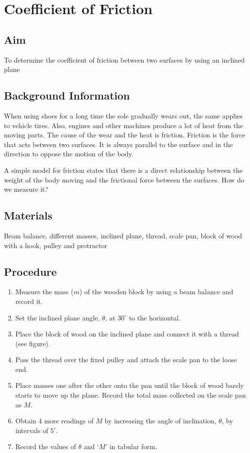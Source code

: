 \chapter{Coefficient of Friction}

\section{Aim}
To determine the coefficient of friction between two surfaces by using an inclined plane

\section{Background Information}
When using shoes for a long time the sole gradually wears out, the same applies to vehicle tires. Also, engines and other machines produce a lot of heat from the moving parts. The cause of the wear and the heat is friction. Friction is the force that acts between two surfaces. It is always parallel to the surface and in the direction to oppose the motion of the body. 

A simple model for friction states that there is a direct relationship between the weight of the body moving and the frictional force between the surfaces. How do we measure it?


\section{Materials}
Beam balance, different masses, inclined plane, thread, scale pan, block of wood with a hook, pulley and protractor

\section{Procedure}
\begin{enumerate}
\item Measure the mass ($m$) of the wooden block by using a beam balance and record it.
\item Set the inclined plane angle, $\theta$, at $30^\circ$ to the horizontal.
\item Place the block of wood on the inclined plane and connect it with a thread (see figure).
\item Pass the thread over the fixed pulley and attach the scale pan to the loose end.
\item Place masses one after the other onto the pan until the block of wood barely starts to move up the plane. Record the total mass collected on the scale pan as $M$.
\item Obtain 4 more readings of $M$ by increasing the angle of inclination, $\theta$, by intervals of $5^\circ$. 
\item Record the values of $\theta$ and ‘$M$’ in tabular form.
\end{enumerate}

